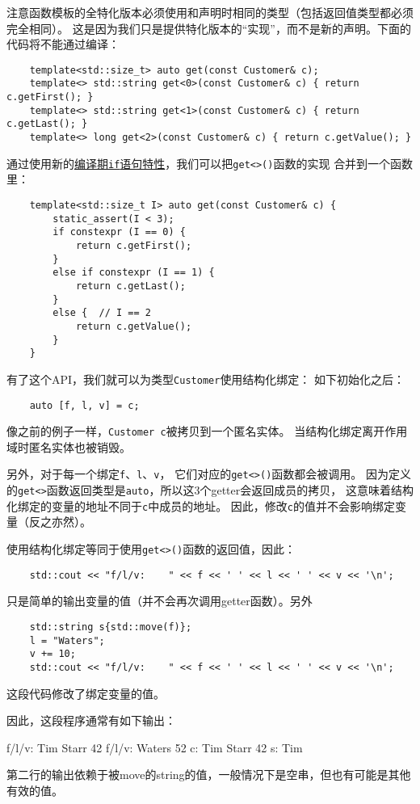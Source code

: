 注意函数模板的全特化版本必须使用和声明时相同的类型（包括返回值类型都必须完全相同）。
这是因为我们只是提供特化版本的“实现”，而不是新的声明。下面的代码将不能通过编译：
\begin{lstlisting}
    template<std::size_t> auto get(const Customer& c);
    template<> std::string get<0>(const Customer& c) { return c.getFirst(); }
    template<> std::string get<1>(const Customer& c) { return c.getLast(); }
    template<> long get<2>(const Customer& c) { return c.getValue(); }
\end{lstlisting}
通过使用新的\hyperref[ch10]{编译期\texttt{if}语句特性}，我们可以把\texttt{get<>()}函数的实现
\label{编译期if实现get<>}
合并到一个函数里：
\begin{lstlisting}
    template<std::size_t I> auto get(const Customer& c) {
        static_assert(I < 3);
        if constexpr (I == 0) {
            return c.getFirst();
        }
        else if constexpr (I == 1) {
            return c.getLast();
        }
        else {  // I == 2
            return c.getValue();
        }
    }
\end{lstlisting}
有了这个API，我们就可以为类型\texttt{Customer}使用结构化绑定：
如下初始化之后：
\begin{lstlisting}
    auto [f, l, v] = c;
\end{lstlisting}
像之前的例子一样，\texttt{Customer c}被拷贝到一个匿名实体。
当结构化绑定离开作用域时匿名实体也被销毁。

另外，对于每一个绑定\texttt{f}、\texttt{l}、\texttt{v}，
它们对应的\texttt{get<>()}函数都会被调用。
因为定义的\texttt{get<>}函数返回类型是\texttt{auto}，所以这3个getter会返回成员的拷贝，
这意味着结构化绑定的变量的地址不同于\texttt{c}中成员的地址。
因此，修改\texttt{c}的值并不会影响绑定变量（反之亦然）。

使用结构化绑定等同于使用\texttt{get<>()}函数的返回值，因此：
\begin{lstlisting}
    std::cout << "f/l/v:    " << f << ' ' << l << ' ' << v << '\n';
\end{lstlisting}
只是简单的输出变量的值（并不会再次调用getter函数）。另外
\begin{lstlisting}
    std::string s{std::move(f)};
    l = "Waters";
    v += 10;
    std::cout << "f/l/v:    " << f << ' ' << l << ' ' << v << '\n';
\end{lstlisting}
这段代码修改了绑定变量的值。

因此，这段程序通常有如下输出：
\begin{blacklisting}
    f/l/v:    Tim Starr 42
    f/l/v:     Waters 52
    c:        Tim Starr 42
    s:        Tim
\end{blacklisting}
第二行的输出依赖于被move的string的值，一般情况下是空串，但也有可能是其他有效的值。


